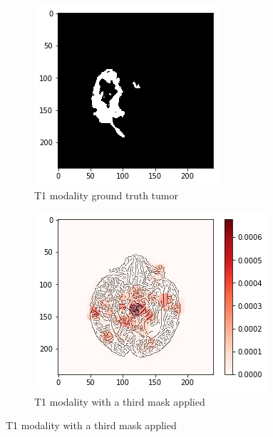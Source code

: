 \begin{figure}[H]
\begin{subfigure}[t]{.4\textwidth}
        \includegraphics[width=\linewidth]{chapters/06_hdm/a_Brats18_TCIA02_491_1_L2/0.png}
        \caption{T1 modality ground truth tumor}
    \end{subfigure}
    \begin{subfigure}[t]{.45\textwidth}
        \centering
        \includegraphics[width=\linewidth]{chapters/06_hdm/a_Brats18_TCIA02_491_1_L2/3.png}
        \caption{T1 modality with a third mask applied}
    \end{subfigure}\hspace{1cm}%

\end{figure}
